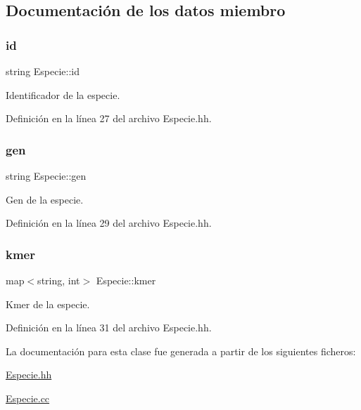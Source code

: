 \subsection{Documentación de los datos miembro}
\mbox{\label{class_especie_a91b94109fb8a456bba7199cdda36d588}} 
\subsubsection{\texorpdfstring{id}{id}}
{\footnotesize\ttfamily string Especie\+::id\hspace{0.3cm}{\ttfamily [private]}}



Identificador de la especie. 



Definición en la línea 27 del archivo Especie.\+hh.

\mbox{\label{class_especie_ac35bb565f7346cd6317b3a8c849456d1}} 
\subsubsection{\texorpdfstring{gen}{gen}}
{\footnotesize\ttfamily string Especie\+::gen\hspace{0.3cm}{\ttfamily [private]}}



Gen de la especie. 



Definición en la línea 29 del archivo Especie.\+hh.

\mbox{\label{class_especie_aa438e3e2f785d96c0ac51e83f60a5879}} 
\subsubsection{\texorpdfstring{kmer}{kmer}}
{\footnotesize\ttfamily map$<$string, int$>$ Especie\+::kmer\hspace{0.3cm}{\ttfamily [private]}}



Kmer de la especie. 



Definición en la línea 31 del archivo Especie.\+hh.



La documentación para esta clase fue generada a partir de los siguientes ficheros\+:\begin{DoxyCompactItemize}
\item 
\hyperlink{_especie_8hh}{Especie.\+hh}\item 
\hyperlink{_especie_8cc}{Especie.\+cc}\end{DoxyCompactItemize}
